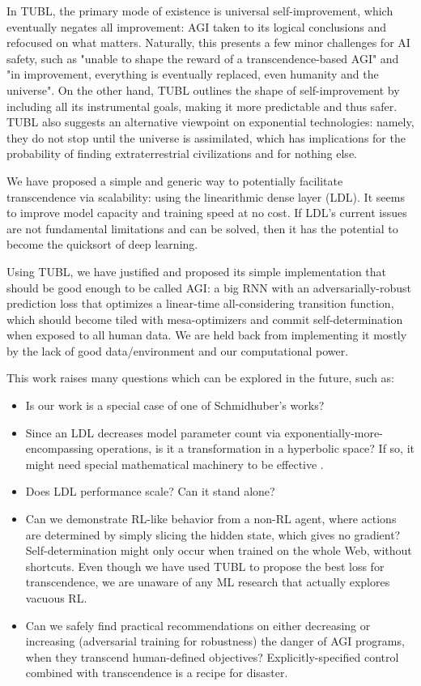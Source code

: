 \documentclass{article}
\begin{document}
In TUBL, the primary mode of existence is universal self-improvement, which eventually negates all improvement: AGI taken to its logical conclusions and refocused on what matters. Naturally, this presents a few minor challenges for AI safety, such as "unable to shape the reward of a transcendence-based AGI" and "in improvement, everything is eventually replaced, even humanity and the universe". On the other hand, TUBL outlines the shape of self-improvement by including all its instrumental goals, making it more predictable and thus safer. TUBL also suggests an alternative viewpoint on exponential technologies: namely, they do not stop until the universe is assimilated, which has implications for the probability of finding extraterrestrial civilizations and for nothing else.

We have proposed a simple and generic way to potentially facilitate transcendence via scalability: using the linearithmic dense layer (LDL). It seems to improve model capacity and training speed at no cost. If LDL's current issues are not fundamental limitations and can be solved, then it has the potential to become the quicksort of deep learning.

Using TUBL, we have justified and proposed its simple implementation that should be good enough to be called AGI: a big RNN with an adversarially-robust prediction loss that optimizes a linear-time all-considering transition function, which should become tiled with mesa-optimizers and commit self-determination when exposed to all human data. We are held back from implementing it mostly by the lack of good data/environment and our computational power.

This work raises many questions which can be explored in the future, such as:

\begin{itemize}
\item Is our work is a special case of one of Schmidhuber's works?

\item Since an LDL decreases model parameter count via exponentially-more-encompassing operations, is it a transformation in a hyperbolic space? If so, it might need special mathematical machinery to be effective \cite{peng2021hyperbolic}.

\item Does LDL performance scale? Can it stand alone?

\item Can we demonstrate RL-like behavior from a non-RL agent, where actions are determined by simply slicing the hidden state, which gives no gradient? Self-determination might only occur when trained on the whole Web, without shortcuts. Even though we have used TUBL to propose the best loss for transcendence, we are unaware of any ML research that actually explores vacuous RL.

\item Can we safely find practical recommendations on either decreasing or increasing (adversarial training for robustness) the danger of AGI programs, when they transcend human-defined objectives? Explicitly-specified control combined with transcendence is a recipe for disaster.
\end{itemize}
\end{document}
